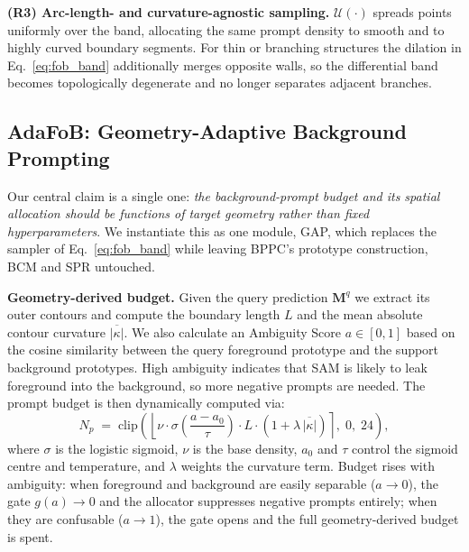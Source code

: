\textbf{(R3) Arc-length- and curvature-agnostic sampling.} $\mathcal{U}(\cdot)$
spreads points uniformly over the band, allocating the same prompt density to
smooth and to highly curved boundary segments. For thin or branching
structures the dilation in Eq.~\eqref{eq:fob_band} additionally merges opposite
walls, so the differential band becomes topologically degenerate and no longer
separates adjacent branches.

\subsection{AdaFoB: Geometry-Adaptive Background Prompting}
\label{subsec:adafob}

Our central claim is a single one: \emph{the background-prompt budget and its
spatial allocation should be functions of target geometry rather than fixed
hyperparameters}. We instantiate this as one module, GAP, which replaces the
sampler of Eq.~\eqref{eq:fob_band} while leaving BPPC's prototype construction,
BCM and SPR untouched.

\textbf{Geometry-derived budget.} Given the query prediction $\mathbf{M}^{q}$ we
extract its outer contours and compute the boundary length $L$ and the mean
absolute contour curvature $\overline{|\kappa|}$. We also calculate an
Ambiguity Score $a \in [0, 1]$ based on the cosine similarity between the query
foreground prototype and the support background prototypes. High ambiguity
indicates that SAM is likely to leak foreground into the background, so more
negative prompts are needed. The prompt budget is then dynamically computed via:
\begin{equation}
  N_{p} \;=\; \mathrm{clip}\!\left(\left\lfloor \nu \cdot \sigma\!\left(\frac{a - a_0}{\tau}\right) \cdot L \cdot (1 + \lambda\,\overline{|\kappa|}) \right\rceil,\; 0,\; 24\right),
  \label{eq:budget}
\end{equation}
where $\sigma$ is the logistic sigmoid, $\nu$ is the base density,
$a_0$ and $\tau$ control the sigmoid centre and temperature, and
$\lambda$ weights the curvature term. Budget rises with ambiguity:
when foreground and background are easily separable ($a \to 0$), the gate
$g(a) \to 0$ and the allocator suppresses negative prompts entirely;
when they are confusable ($a \to 1$), the gate opens and the full
geometry-derived budget is spent.


